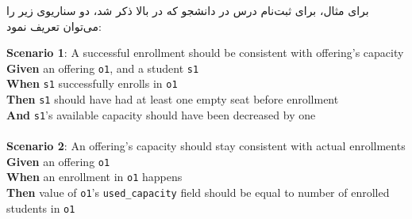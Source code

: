 برای مثال، برای  ثبت‌نام درس در دانشجو که در بالا ذکر
شد، دو سناریوی زیر را می‌توان تعریف نمود: \\

\begin{minipage}{\textwidth}
\latin\textbf{Scenario 1}: A successful enrollment should be consistent with offering's capacity
\textbf{Given}
	an offering \texttt{o1}, and a student \texttt{s1}\\
\textbf{When}
	\texttt{s1} successfully enrolls in \texttt{o1}\\
\textbf{Then}
	\texttt{s1} should have had at least one empty seat before enrollment\\
\textbf{And}
	\texttt{s1}'s available capacity should have been decreased by one\\
\\
\textbf{Scenario 2}: An offering's capacity should stay consistent with actual enrollments 
\textbf{Given}
	an offering \texttt{o1}\\
\textbf{When}
	an enrollment in \texttt{o1} happens\\
\textbf{Then}
	value of \texttt{o1}'s \texttt{used\_capacity} field should be equal to number of enrolled students in \texttt{o1}\\
\end{minipage}




